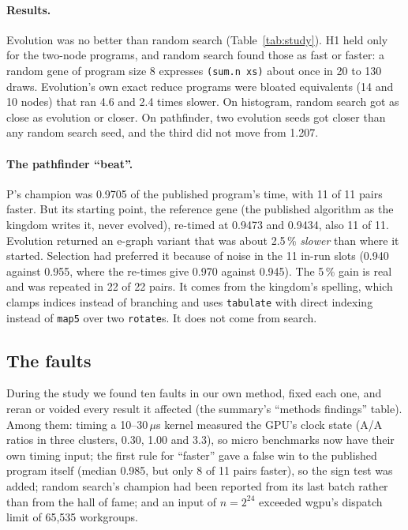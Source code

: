 \documentclass[sigconf,nonacm]{acmart}
\begin{document}
\paragraph{Results.} Evolution was no better than random search
(Table~\ref{tab:study}). H1 held only for the two-node programs, and random
search found those as fast or faster: a random gene of program size 8 expresses
\texttt{(sum.n xs)} about once in 20 to 130 draws. Evolution's own exact reduce
programs were bloated equivalents (14 and 10 nodes) that ran 4.6 and 2.4 times
slower. On histogram, random search got as close as evolution or closer. On
pathfinder, two evolution seeds got closer than any random search seed, and the
third did not move from 1.207.

\paragraph{The pathfinder ``beat''.} P's champion was 0.9705 of the published
program's time, with 11 of 11 pairs faster. But its starting point, the reference
gene (the published algorithm as the kingdom writes it, never evolved), re-timed
at 0.9473 and 0.9434, also 11 of 11. Evolution returned an e-graph variant that
was about 2.5\,\% \emph{slower} than where it started. Selection had preferred it
because of noise in the 11 in-run slots (0.940 against 0.955, where the re-times
give 0.970 against 0.945). The 5\,\% gain is real and was repeated in 22 of 22
pairs. It comes from the kingdom's spelling, which clamps indices instead of
branching and uses \texttt{tabulate} with direct indexing instead of
\texttt{map5} over two \texttt{rotate}s. It does not come from search.

\subsection{The faults}
\label{sec:faults}
During the study we found ten faults in our own method, fixed each one, and
reran or voided every result it affected (the summary's ``methods findings''
table). Among them: timing a 10--30\,$\mu$s kernel measured the GPU's clock state
(A/A ratios in three clusters, 0.30, 1.00 and 3.3), so micro benchmarks now have
their own timing input; the first rule for ``faster'' gave a false win to the
published program itself (median 0.985, but only 8 of 11 pairs faster), so the
sign test was added; random search's champion had been reported from its last
batch rather than from the hall of fame; and an input of $n=2^{24}$ exceeded
wgpu's dispatch limit of 65,535 workgroups.
\end{document}
